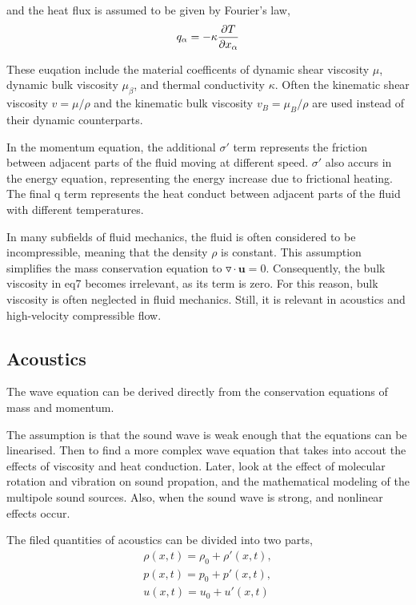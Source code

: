 \documentclass{Note}
\begin{document}
and the heat flux is assumed to be given by Fourier's law,
\begin{equation}
\begin{aligned}
q_\alpha =-\kappa {\partial T\over \partial x_\alpha}
\end{aligned}
\end{equation}

These euqation include the material coefficents of dynamic shear viscosity $\mu$, dynamic bulk viscosity $\mu_\beta$, and thermal conductivity $\kappa$. Often the kinematic shear viscosity $v=\mu/\rho$ and the kinematic bulk viscosity $v_B=\mu_B/\rho$ are used instead of their dynamic counterparts.

In the momentum equation, the additional $\sigma'$ term represents the friction between adjacent parts of the fluid moving at different speed.  $\sigma'$ also accurs in the energy equation, representing the energy increase due to frictional heating. The final q term represents the heat conduct between adjacent parts of the fluid with different temperatures.

In many subfields of fluid mechanics, the fluid is often considered to be incompressible, meaning that the density $\rho$ is constant. This assumption simplifies the mass conservation equation to $\triangledown \cdot \textbf{u}=0$. Consequently, the bulk viscosity in eq7 becomes irrelevant, as its term is zero. For this reason, bulk viscosity is often neglected in fluid mechanics. Still, it is relevant in acoustics and high-velocity compressible flow.


\subsection{Acoustics}
The wave equation can be derived directly from the conservation equations of mass and momentum.

The assumption is that the sound wave is weak enough that the equations can be linearised. Then to find a more complex wave equation that takes into accout the effects of viscosity and heat conduction. Later, look at the effect of molecular rotation and vibration on sound propation, and the mathematical modeling of the multipole sound sources. Also, when the sound wave is strong, and nonlinear effects occur.

The filed quantities of acoustics can be divided into two parts,
\begin{equation}
\begin{aligned}
\rho(x,t)=\rho_0+\rho'(x,t),\\
p(x,t)=p_0+p'(x,t),\\
u(x,t)=u_0+u'(x,t)
\end{aligned}
\end{equation}
\end{document}

